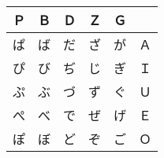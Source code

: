 \begin{center}
\begin{tabular}{|ccccc|c|}
\hline
Ｐ & Ｂ & Ｄ & Ｚ & Ｇ &    \\\hline
ぱ & ば & だ & ざ & が & Ａ \\
ぴ & び & ぢ & じ & ぎ & Ｉ \\
ぷ & ぶ & づ & ず & ぐ & Ｕ \\
ぺ & べ & で & ぜ & げ & Ｅ \\
ぽ & ぼ & ど & ぞ & ご & Ｏ \\
\hline
\end{tabular}
\end{center}
